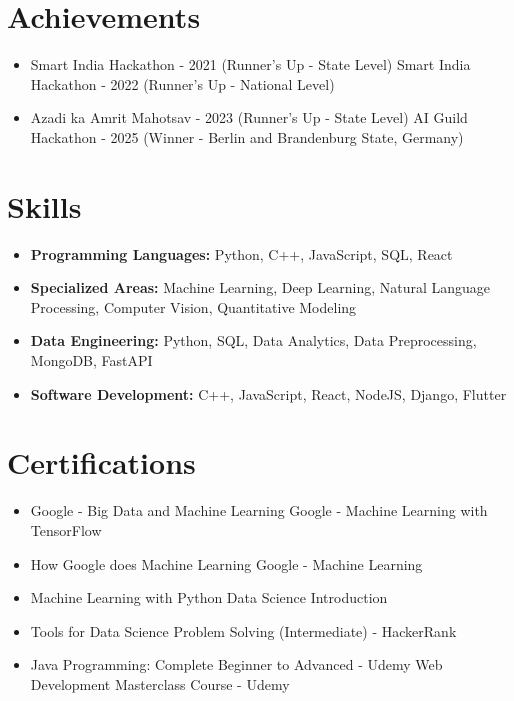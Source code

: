 \documentclass[a4paper,10pt]{article}
\begin{document}
\section*{Achievements}
\begin{itemize}
\item Smart India Hackathon - 2021 (Runner's Up - State Level) \hfill Smart India Hackathon - 2022 (Runner's Up - National Level)
\item Azadi ka Amrit Mahotsav - 2023 (Runner's Up - State Level) \hfill AI Guild Hackathon - 2025 (Winner - Berlin and Brandenburg State, Germany)
\end{itemize}

\section*{Skills}
\begin{itemize}
  \item \textbf{Programming Languages:} Python, C++, JavaScript, SQL, React
  \item \textbf{Specialized Areas:} Machine Learning, Deep Learning, Natural Language Processing, Computer Vision, Quantitative Modeling
  \item \textbf{Data Engineering:} Python, SQL, Data Analytics, Data Preprocessing, MongoDB, FastAPI
  \item \textbf{Software Development:} C++, JavaScript, React, NodeJS, Django, Flutter
\end{itemize}

\section*{Certifications}
\begin{itemize}
\item Google - Big Data and Machine Learning \hfill Google - Machine Learning with TensorFlow
\item How Google does Machine Learning \hfill Google - Machine Learning
\item Machine Learning with Python \hfill Data Science Introduction
\item Tools for Data Science \hfill Problem Solving (Intermediate) - HackerRank
\item Java Programming: Complete Beginner to Advanced - Udemy \hfill Web Development Masterclass Course - Udemy
\end{itemize}
\end{document}

